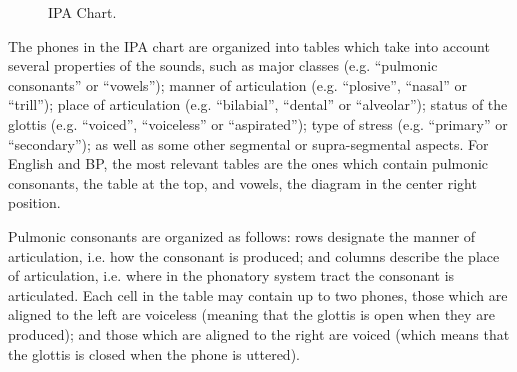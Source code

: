 \begin{figure}[!ht]
        \noindent{}
        \caption{IPA Chart.}\label{fig:ipa-chart}
\end{figure}


The phones in the \ac{IPA} chart are organized into tables which take into account several properties of the sounds, such as major classes (e.g. ``pulmonic consonants'' or ``vowels''); manner of articulation (e.g. ``plosive'', ``nasal'' or ``trill''); place of articulation (e.g. ``bilabial'', ``dental'' or ``alveolar''); status of the glottis (e.g. ``voiced'', ``voiceless'' or ``aspirated''); type of stress (e.g. ``primary'' or ``secondary''); as well as some other segmental or supra-segmental aspects. For English and \gls{BP}, the most relevant tables are the ones which contain pulmonic consonants, the table at the top, and vowels, the diagram in the center right position. 

Pulmonic consonants are organized as follows: rows designate the manner of articulation, i.e. how the consonant is produced; and columns describe the place of articulation, i.e. where in the phonatory system tract the consonant is articulated. Each cell in the table may contain up to two phones, those which are aligned to the left are voiceless (meaning that the glottis is open when they are produced); and those which are aligned to the right are voiced (which means that the glottis is closed when the phone is uttered). 

